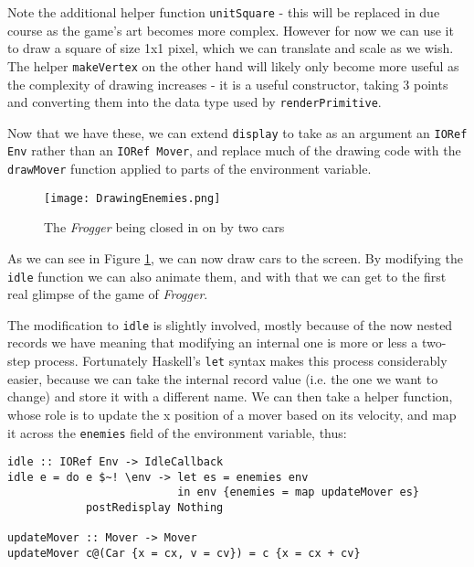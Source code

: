 \documentclass[12pt, a4paper]{report}
\begin{document}
Note the additional helper function \verb|unitSquare| - this will be replaced in due course as the game's art becomes more complex.
However for now we can use it to draw a square of size 1x1 pixel, which we can translate and scale as we wish.
The helper \verb|makeVertex| on the other hand will likely only become more useful as the complexity of drawing increases - it is a useful constructor, taking 3 points and converting them into the data type used by \verb|renderPrimitive|.

\par

Now that we have these, we can extend \verb|display| to take as an argument an \verb|IORef Env| rather than an \verb|IORef Mover|, and replace much of the drawing code with the \verb|drawMover| function applied to parts of the environment variable.

\begin{figure}[ht]
  \centering
  \caption{The \textit{Frogger} being closed in on by two cars}
  \texttt{[image: DrawingEnemies.png]}
  \label{fig:drawingenemies}
\end{figure}

As we can see in Figure \ref{fig:drawingenemies}, we can now draw cars to the screen.
By modifying the \verb|idle| function we can also animate them, and with that we can get to the first real glimpse of the game of \textit{Frogger}.

\par

The modification to \verb|idle| is slightly involved, mostly because of the now nested records we have meaning that modifying an internal one is more or less a two-step process.
Fortunately Haskell's \verb|let| syntax makes this process considerably easier, because we can take the internal record value (i.e. the one we want to change) and store it with a different name.
We can then take a helper function, whose role is to update the x position of a mover based on its velocity, and map it across the \verb|enemies| field of the environment variable, thus:

\begin{lstlisting}
idle :: IORef Env -> IdleCallback
idle e = do e $~! \env -> let es = enemies env
                          in env {enemies = map updateMover es}
            postRedisplay Nothing

updateMover :: Mover -> Mover
updateMover c@(Car {x = cx, v = cv}) = c {x = cx + cv}
\end{lstlisting}
\end{document}
